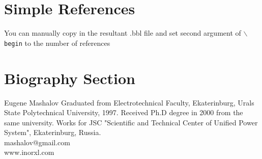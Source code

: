 \documentclass[lettersize,journal]{IEEEtran}
\begin{document}
%
\section{Simple References}
You can manually copy in the resultant .bbl file and set second argument of $\backslash${\tt{begin}} to the number of references 





\newpage
\section{Biography Section}
\vspace{-33pt}
\begin{IEEEbiography}{Eugene Mashalov}
Graduated from Electrotechnical Faculty, Ekaterinburg, Urals State Polytechnical University, 1997. 
Received Ph.D degree in 2000 from the same university. 
Works for JSC "Scientific and Technical Center of Unified Power System", Ekaterinburg, Russia.\\
mashalov@gmail.com \\
www.inorxl.com
\end{IEEEbiography}
\vfill
\end{document}
